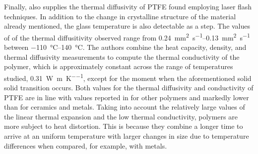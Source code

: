 Finally, \cite{blummCharacterizationPTFEUsing2010} also supplies the thermal diffusivity of PTFE found employing laser flash techniques.
In addition to the change in crystalline structure of the material already mentioned, the glass temperature is also detectable as a step.
The values of of the thermal diffusitivity observed range from \SIrange{0.24}{0.13}{\milli\meter^2\per\second} between \SIrange{-110}{140}{\celsius}.
The authors combine the heat capacity, density, and thermal diffusivity measurements to compute the thermal conductivity of the polymer, which is approximately constant across the range of temperatures studied, \SI{0.31}{\watt\per\meter\per\kelvin}, except for the moment when the aforementioned solid solid transition occurs.
Both values for the thermal diffusivity and conductivity of PTFE are in line with values reported in \cite{ashbyMaterialsSelectionMechanical1999} for other polymers and markedly lower than for ceramics and metals.
Taking into account the relatively large values of the linear thermal expansion and the low thermal conductivity, polymers are more subject to heat distortion.
This is because they combine a longer time to arrive at an uniform temperature with larger changes in size due to temperature differences when compared, for example, with metals.
